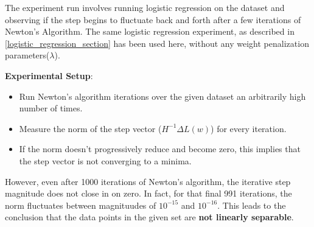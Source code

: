 \documentclass[a4paper]{article}
\begin{document}
The experiment run involves running logistic regression on the dataset and observing if the step begins to fluctuate back and forth after a few iterations of Newton's Algorithm. The same logistic regression experiment, as described in \ref{logistic_regression_section} has been used here, without any weight penalization parameters($\lambda$). 

\textbf{Experimental Setup}:
\begin{itemize}
    \item Run Newton's algorithm iterations over the given dataset an arbitrarily high number of times.
    \item Measure the norm of the step vector ($H^{-1} \Delta L(w)$) for every iteration.
    \item If the norm doesn't progressively reduce and become zero, this implies that the step vector is not converging to a minima.
\end{itemize}

However, even after 1000 iterations of Newton's algorithm, the iterative step magnitude does not close in on zero. In fact, for that final 991 iterations, the norm fluctuates between magnituudes of $10^{-15}$ and $10^{-16}$. This leads to the conclusion that the data points in the given set are \textbf{not linearly separable}.
\end{document}
